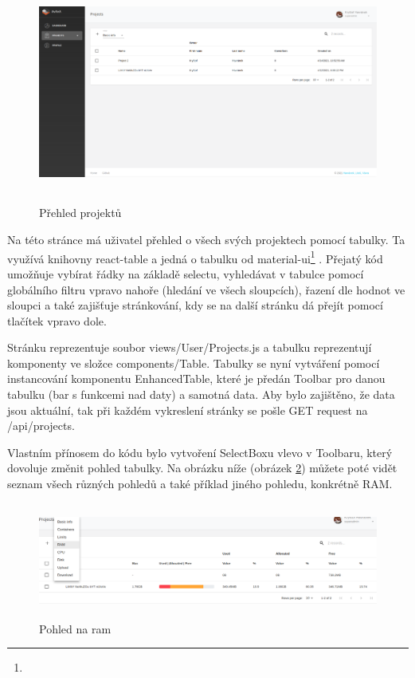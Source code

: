 \documentclass[a4paper,oneside,12pt]{report}
\begin{document}
\begin{figure}[h]
	\centering
	\includegraphics[height=7.3cm]{../img/projectsOverview.png}
	\caption[Přehled projektů, vlastní tvorba]{Přehled projektů}
	\label{fig:projectOverview}
\end{figure}


Na této stránce má uživatel přehled o všech svých projektech pomocí tabulky.
Ta využívá knihovny react-table a jedná o tabulku od material-ui\footnote{} .
Přejatý kód umožňuje vybírat řádky na základě selectu, vyhledávat v tabulce pomocí globálního filtru vpravo nahoře (hledání ve všech sloupcích), řazení dle hodnot ve sloupci a také zajišťuje stránkování, kdy se na další stránku dá přejít pomocí tlačítek vpravo dole.

Stránku reprezentuje soubor views/User/Projects.js a tabulku reprezentují komponenty ve složce components/Table.
Tabulky se nyní vytváření pomocí instancování komponentu EnhancedTable, které je předán Toolbar pro danou tabulku (bar s funkcemi nad daty) a samotná data.
Aby bylo zajištěno, že data jsou aktuální, tak při každém vykreslení stránky se pošle GET request na /api/projects.

Vlastním přínosem do kódu bylo vytvoření SelectBoxu vlevo v Toolbaru, který dovoluje změnit pohled tabulky. Na obrázku níže (obrázek \ref{fig:ram}) můžete poté vidět seznam všech různých pohledů a také příklad jiného pohledu, konkrétně RAM.

\begin{figure}[h]
	\centering
	\includegraphics[height=3.8cm]{../img/ram.png}
	\caption[Pohled na ram, vlastní tvorba]{Pohled na ram}
	\label{fig:ram}
\end{figure}
\end{document}
